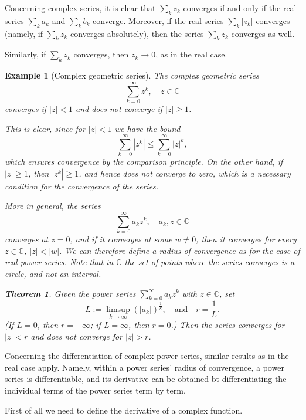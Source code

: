 \documentclass[a4paper,reqno]{amsart}
\numberwithin{equation}{section}
\newtheorem{theorem}[definition]{Theorem}
\newtheorem{example}[definition]{Example}
\def\C{\mathbb{C}}
\begin{document}
\bigskip

\noindent
Concerning complex series, it is clear that $\sum_k z_k$ converges if and only if the real series $\sum_k a_k$ and $\sum_k b_k$ converge. Moreover, if the real series $\sum_k |z_k|$ converges (namely, if $\sum_k z_k$ converges absolutely), then the series $\sum_k z_k$ converges as well.

Similarly, if $\sum_k z_k$ converges, then $z_k \to 0$, as in the real case. 

\begin{example}[Complex geometric series]
The complex geometric series 
$$
\sum_{k=0}^\infty z^k, \quad z\in \C
$$
converges if $|z|<1$ and does not converge if $|z|\geq 1$.

This is clear, since for $|z|<1$ we have the bound
$$
\sum_{k=0}^\infty |z^k| \leq \sum_{k=0}^\infty |z|^k,
$$
which ensures convergence by the comparison principle. On the other hand, if $|z|\geq 1$, then $|z^k|\geq 1$, and hence does not converge to zero, which is a necessary condition for the convergence of the series.



\bigskip

More in general, the series 
$$
\sum_{k=0}^\infty a_k z^k, \quad a_k, z\in \C
$$
converges at $z=0$, and if it converges at some $w\neq 0$, then it converges for every $z\in \C$, $|z|<|w|$. 
We can therefore define a radius of convergence as for the case of real power series. Note that in $\C$ the set of points 
where the series converges is a circle, and not an interval.

\begin{theorem}
Given the power series $\sum_{k=0}^\infty a_k z^k$ with $z\in \C$, set
$$
L:= \limsup_{k\to \infty} (|a_k|)^{\frac1k}, \quad \textrm{and} \quad r=\frac1L.
$$
(If $L=0$, then $r=+\infty$; if $L=\infty$, then $r=0$.) Then the series converges for $|z|<r$ and does not converge for $|z|>r$.
\end{theorem}
\end{example}

\medskip

Concerning the differentiation of complex power series, similar results as in the real case apply. Namely, within a power series' radius of convergence, a power series is differentiable, and its derivative can be obtained bt differentiating the individual terms of the power series term by term.

First of all we need to define the derivative of a complex function.
\end{document}

